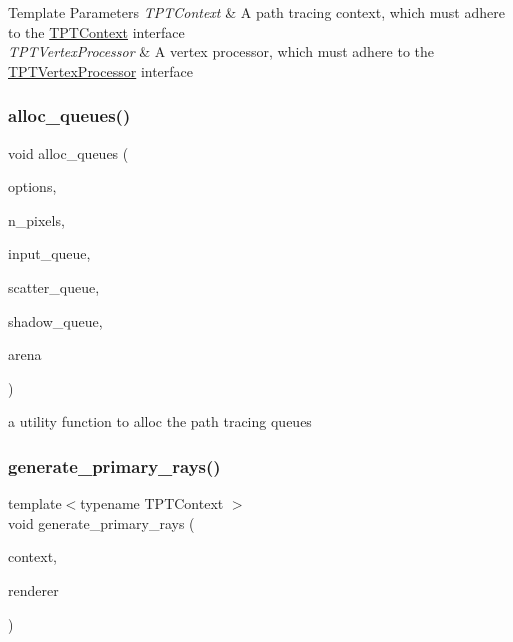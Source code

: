 \begin{DoxyTemplParams}{Template Parameters}
{\em T\+P\+T\+Context} & A path tracing context, which must adhere to the \hyperlink{_p_t_lib_page_TPTContext}{T\+P\+T\+Context} interface \\
\hline
{\em T\+P\+T\+Vertex\+Processor} & A vertex processor, which must adhere to the \hyperlink{_p_t_lib_page_TPTVertexProcessor}{T\+P\+T\+Vertex\+Processor} interface \\
\hline
\end{DoxyTemplParams}
\mbox{\label{group___p_t_lib_gaf8daef8b815f7712ff692edbaa628881}} 
\subsubsection{\texorpdfstring{alloc\+\_\+queues()}{alloc\_queues()}}
{\footnotesize\ttfamily void alloc\+\_\+queues (\begin{DoxyParamCaption}\item[{\hyperlink{struct_p_t_options}{P\+T\+Options}}]{options,  }\item[{const uint32}]{n\+\_\+pixels,  }\item[{\hyperlink{struct_p_t_ray_queue}{P\+T\+Ray\+Queue} \&}]{input\+\_\+queue,  }\item[{\hyperlink{struct_p_t_ray_queue}{P\+T\+Ray\+Queue} \&}]{scatter\+\_\+queue,  }\item[{\hyperlink{struct_p_t_ray_queue}{P\+T\+Ray\+Queue} \&}]{shadow\+\_\+queue,  }\item[{\hyperlink{structcugar_1_1memory__arena}{cugar\+::memory\+\_\+arena} \&}]{arena }\end{DoxyParamCaption})\hspace{0.3cm}{\ttfamily [inline]}}

a utility function to alloc the path tracing queues \mbox{\label{group___p_t_lib_ga66602a846711dc021ed0b930846ea596}} 
\subsubsection{\texorpdfstring{generate\+\_\+primary\+\_\+rays()}{generate\_primary\_rays()}}
{\footnotesize\ttfamily template$<$typename T\+P\+T\+Context $>$ \\
void generate\+\_\+primary\+\_\+rays (\begin{DoxyParamCaption}\item[{T\+P\+T\+Context}]{context,  }\item[{const \hyperlink{struct_rendering_context_view}{Rendering\+Context\+View}}]{renderer }\end{DoxyParamCaption})}

